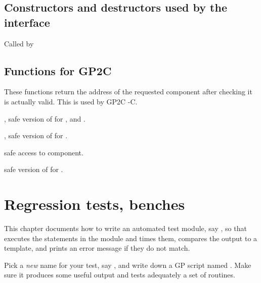 {







\section{Constructors and destructors used by the  interface}

\item Called by 


\section{Functions for GP2C}


These functions return the address of the requested component after checking
it is actually valid. This is used by GP2C -C.

, safe version of  for ,
 and .

, safe version of  for .

 safe access to  component.

 safe version of
 for .

\newpage

\chapter{Regression tests, benches}

This chapter documents how to write an automated test module, say ,
so that  executes the statements in the  module
and times them, compares the output to a template, and prints an error
message if they do not match.

\item Pick a \emph{new} name for your test, say , and write down a
GP script named . Make sure it produces some useful output and tests
adequately a set of routines.

}
